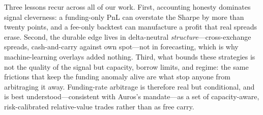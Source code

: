 \documentclass[10pt,twocolumn,a4paper]{article}
\begin{document}
Three lessons recur across all of our work.  First, accounting honesty
dominates signal cleverness: a funding-only PnL can overstate the Sharpe by
more than twenty points, and a fee-only backtest can manufacture a profit
that real spreads erase.  Second, the durable edge lives in delta-neutral
\emph{structure}---cross-exchange spreads, cash-and-carry against own
spot---not in forecasting, which is why machine-learning overlays added
nothing.  Third, what bounds these strategies is not the quality of the
signal but capacity, borrow limits, and regime: the same frictions that
keep the funding anomaly alive are what stop anyone from arbitraging it
away.  Funding-rate arbitrage is therefore real but conditional, and is
best understood---consistent with Auros's mandate---as a set of
capacity-aware, risk-calibrated relative-value trades rather than as free
carry.


{\small

\nocite{he2022perpetual}
\nocite{ackerer2024perpetual}
\nocite{makarov2020trading}
\nocite{liu2022common}
\nocite{schmeling2023crypto}
\nocite{foucault2017toxic}
\nocite{almgren2001optimal}
\nocite{moreira2017volatility}
\nocite{borri2022cross}
\nocite{hu2023crypto}
\nocite{sebastiao2021forecasting}
\nocite{bailey2014deflated}
\nocite{newey1987simple}
\nocite{moskowitz2012time}
\nocite{shleifer1997limits}
\nocite{koijen2018carry}
\nocite{brunnermeier2009market}
\nocite{duffie2010presidential}
\nocite{frazzini2014betting}
\nocite{alexander2020bitmex}
\nocite{baur2019pricediscovery}
\nocite{binance2024funding}
\nocite{black1976commodity}
\nocite{fama1987commodity}
\nocite{garbade1983price}
\nocite{hasbrouck2007empirical}
\nocite{roll1984simple}
\nocite{shiller1993measuring}

}
\end{document}
